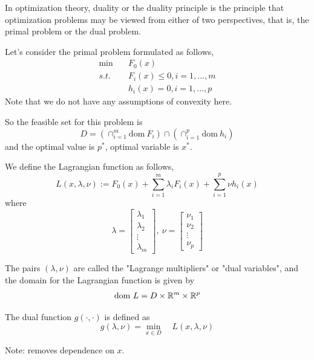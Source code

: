 
In optimization theory, duality or the duality principle is the principle that optimization problems may be viewed from either of two perspectives, that is, the primal problem or the dual problem.

Let's consider the primal problem formulated as follows,
\begin{align*}
\min \quad&F_0(x) \\
s.t. \quad&F_i(x)\leq 0, i = 1,...,m\\
&h_i(x)= 0, i = 1,...,p
\end{align*}
Note that we do not have any assumptions of convexity here.

So the feasible set for this problem is
$$D = (\cap^m_{i=1}\text{dom}\ F_i)\cap(\cap^p_{i=1}\text{dom}\ h_i)$$ 
and the optimal value is $p^*$, optimal variable is $x^*$.

\begin{definition}
	We define the Lagrangian function as follows,
	$$L(x,\lambda,\nu) := F_0(x) + \sum^m_{i=1}\lambda_i F_i(x) + \sum^p_{i=1}\nu h_i(x)$$
	where
	$$\lambda =
	\begin{bmatrix}
		\lambda_1\\
		\lambda_2\\
		\vdots\\
		\lambda_m
	\end{bmatrix},\
	\nu = 
	\begin{bmatrix}
		\nu_1\\
		\nu_2\\
		\vdots\\
		\nu_p
	\end{bmatrix}$$

The pairs $(\lambda, \nu)$ are called the "Lagrange multipliers" or "dual variables", and the domain for the Lagrangian function is given by 
$$\text{dom}\ L = D\times \mathbb{R}^m \times \mathbb{R}^p$$
\end{definition}

\begin{definition}
	The dual function $g(\cdot, \cdot)$ is defined as 
	\begin{equation*}
	g(\lambda, \nu) = \min_{x\in D}\quad L(x,\lambda,\nu)
	\end{equation*}
	
	Note: removes dependence on $x$.
\end{definition}


